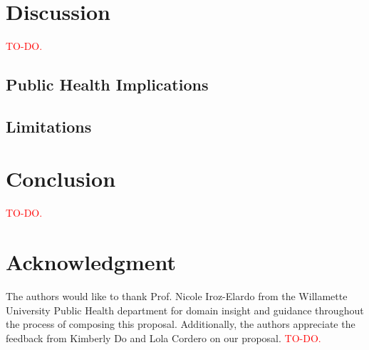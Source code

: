 \documentclass[journal]{IEEEtran}
\newcommand{\todo}{\textcolor{red}{TO-DO.} }
\begin{document}
    \section{Discussion}

    \todo

    \subsection{Public Health Implications}

    \subsection{Limitations}


    \section{Conclusion}

    \todo


    \section*{Acknowledgment}

    The authors would like to thank Prof. Nicole Iroz-Elardo from the Willamette University Public Health department for domain insight and guidance throughout the process of composing this proposal. Additionally, the authors appreciate the feedback from Kimberly Do and Lola Cordero on our proposal. \todo

    
    
\end{document}
